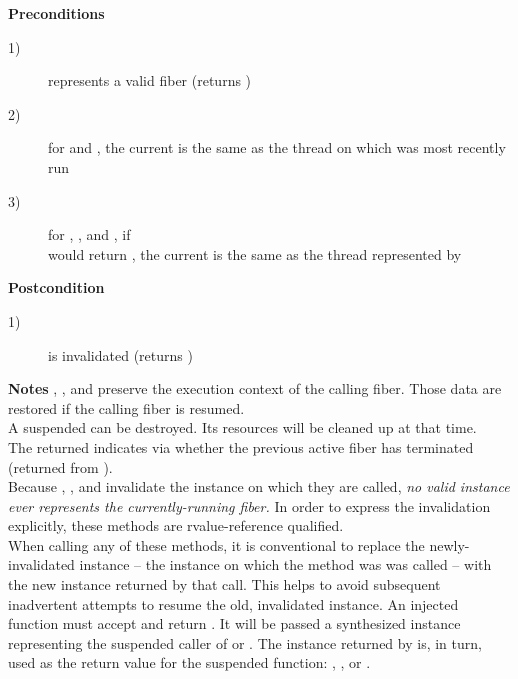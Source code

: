 {\bfseries Preconditions}
\begin{description}
    \item[1)]  represents a valid fiber (\opbool returns )
    \item[2)] for \resume and \resumewith, the current \thread is the same as
              the thread on which  was most recently run
    \item[3)] for \resume, \resumewith, \xtresume and \xtresumewith, if\\
              \usessysstack would return , the current \thread is
              the same as the thread represented by 
\end{description}

{\bfseries Postcondition}
\begin{description}
    \item[1)]  is invalidated (\opbool returns )
\end{description}

{\bfseries Notes}
\newline
\resume, \resumewith, \xtresume and \xtresumewith preserve the execution
context of the calling fiber. Those data are restored if the calling fiber is
resumed.\\
A suspended  can be destroyed. Its resources will be cleaned
up at that time.\\
The returned  indicates via \opbool whether the previous active
fiber has terminated (returned from \entryfn).\\
Because \resume, \resumewith, \xtresume and \xtresumewith invalidate the
instance on which they are called, \emph{no valid \fiber instance ever
represents the currently-running fiber.} In order to express the invalidation
explicitly, these methods are rvalue-reference qualified.\\
When calling any of these methods, it is conventional to replace the
newly-invalidated instance -- the instance on which the method was was called
-- with the new instance returned by that call. This helps to avoid subsequent
inadvertent attempts to resume the old, invalidated instance.
\newline
An injected function  must accept  and
return \fiber. It will be passed a synthesized \fiber instance representing
the suspended caller of \resumewith or \xtresumewith. The \fiber instance
returned by  is, in turn, used as the return value for the suspended
function: \resume, \resumewith, \xtresume or \xtresumewith.

